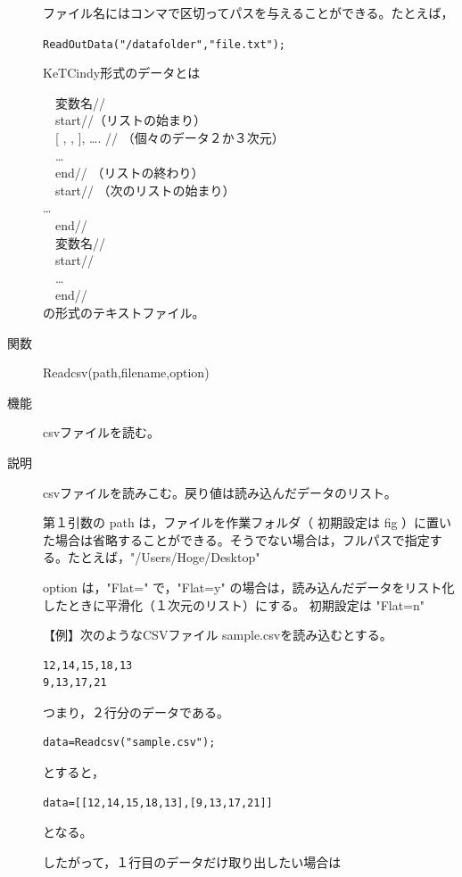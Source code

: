 \documentclass[papersize,a4paper,10pt,uplatex]{jsarticle}
\begin{document}
\begin{description}
ファイル名にはコンマで区切ってパスを与えることができる。たとえば，

\verb|ReadOutData("/datafolder","file.txt"); |

KeTCindy形式のデータとは

　変数名// \\
　start//（リストの始まり） \\
　[ , , ], …. // （個々のデータ２か３次元） \\
　… \\
　end// （リストの終わり） \\
　start// （次のリストの始まり） \\
… \\
　end// \\
　変数名// \\
　start// \\
　… \\
　end// \\

の形式のテキストファイル。

\hypertarget{readcsv}{}
\item[関数]Readcsv(path,filename,option)
\item[機能]csvファイルを読む。
\item[説明]csvファイルを読みこむ。戻り値は読み込んだデータのリスト。

第１引数の path は，ファイルを作業フォルダ（ 初期設定は fig ）に置いた場合は省略することができる。そうでない場合は，フルパスで指定する。たとえば，"/Users/Hoge/Desktop"

option は，"Flat=" で，"Flat=y" の場合は，読み込んだデータをリスト化したときに平滑化（１次元のリスト）にする。 初期設定は "Flat=n"

【例】次のようなCSVファイル sample.csvを読み込むとする。

\begin{verbatim}
12,14,15,18,13
9,13,17,21
\end{verbatim}

つまり，２行分のデータである。

\begin{verbatim}
data=Readcsv("sample.csv");
\end{verbatim}

とすると，
\begin{verbatim}
data=[[12,14,15,18,13],[9,13,17,21]]
\end{verbatim}

となる。

したがって，１行目のデータだけ取り出したい場合は


\end{description}
\end{document}
